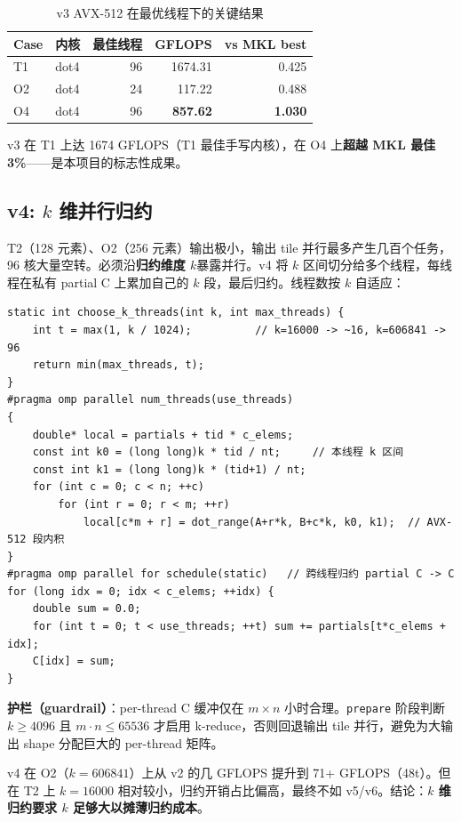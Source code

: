 \documentclass[11pt,a4paper,fontset=fandol]{ctexart}
\begin{document}
\begin{table}[H]
\centering
\caption{v3 AVX-512 在最优线程下的关键结果}
\small
\begin{tabular}{llrrr}
\toprule
Case & 内核 & 最佳线程 & GFLOPS & vs MKL best \\
\midrule
T1 & dot4 & 96 & 1674.31 & 0.425 \\
O2 & dot4 & 24 & 117.22 & 0.488 \\
O4 & dot4 & 96 & \textbf{857.62} & \textbf{1.030} \\
\bottomrule
\end{tabular}
\end{table}
v3 在 T1 上达 1674 GFLOPS（T1 最佳手写内核），在 O4 上\textbf{超越 MKL 最佳 3\%}——是本项目的标志性成果。

\subsection{v4: $k$ 维并行归约}
T2（128 元素）、O2（256 元素）输出极小，输出 tile 并行最多产生几百个任务，96 核大量空转。必须沿\textbf{归约维度 $k$}暴露并行。v4 将 $k$ 区间切分给多个线程，每线程在私有 partial C 上累加自己的 $k$ 段，最后归约。线程数按 $k$ 自适应：
\begin{lstlisting}
static int choose_k_threads(int k, int max_threads) {
    int t = max(1, k / 1024);          // k=16000 -> ~16, k=606841 -> 96
    return min(max_threads, t);
}
#pragma omp parallel num_threads(use_threads)
{
    double* local = partials + tid * c_elems;
    const int k0 = (long long)k * tid / nt;     // 本线程 k 区间
    const int k1 = (long long)k * (tid+1) / nt;
    for (int c = 0; c < n; ++c)
        for (int r = 0; r < m; ++r)
            local[c*m + r] = dot_range(A+r*k, B+c*k, k0, k1);  // AVX-512 段内积
}
#pragma omp parallel for schedule(static)   // 跨线程归约 partial C -> C
for (long idx = 0; idx < c_elems; ++idx) {
    double sum = 0.0;
    for (int t = 0; t < use_threads; ++t) sum += partials[t*c_elems + idx];
    C[idx] = sum;
}
\end{lstlisting}
\textbf{护栏（guardrail）}：per-thread C 缓冲仅在 $m\times n$ 小时合理。\texttt{prepare} 阶段判断 $k\geq4096$ 且 $m\cdot n\leq65536$ 才启用 k-reduce，否则回退输出 tile 并行，避免为大输出 shape 分配巨大的 per-thread 矩阵。

v4 在 O2（$k=606841$）上从 v2 的几 GFLOPS 提升到 71+ GFLOPS（48t）。但在 T2 上 $k=16000$ 相对较小，归约开销占比偏高，最终不如 v5/v6。结论：\textbf{$k$ 维归约要求 $k$ 足够大以摊薄归约成本}。
\end{document}

